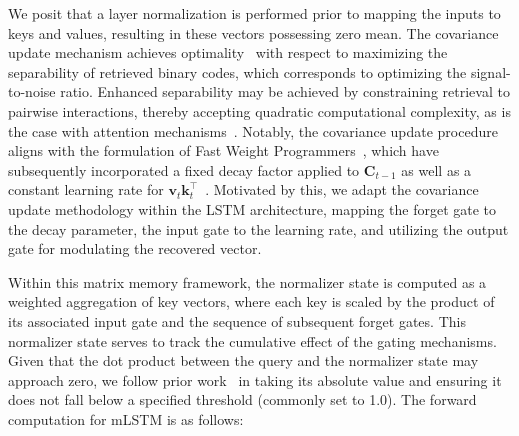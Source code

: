 We posit that a layer normalization is performed prior to mapping the inputs to keys and values, resulting in these vectors possessing zero mean. The covariance update mechanism achieves optimality~\citep{Dayan:91} with respect to maximizing the separability of retrieved binary codes, which corresponds to optimizing the signal-to-noise ratio. Enhanced separability may be achieved by constraining retrieval to pairwise interactions, thereby accepting quadratic computational complexity, as is the case with attention mechanisms~\citep{Krotov:16,Krotov:17,Ramsauer:21}. Notably, the covariance update procedure aligns with the formulation of Fast Weight Programmers~\citep{Schmidhuber:92ncfastweights,Schlag:21}, which have subsequently incorporated a fixed decay factor applied to $\mathbf{C}_{t-1}$ as well as a constant learning rate for 
$\mathbf{v}_{t} \mathbf{k}_t ^\top$~\citep{Ba:16}.
Motivated by this, we adapt the covariance update methodology within the LSTM architecture, mapping the forget gate to the decay parameter, the input gate to the learning rate, and utilizing the output gate for modulating the recovered vector.

Within this matrix memory framework, the normalizer state is computed as a weighted aggregation of key vectors, where each key is scaled by the product of its associated input gate and the sequence of subsequent forget gates. This normalizer state serves to track the cumulative effect of the gating mechanisms. Given that the dot product between the query and the normalizer state may approach zero, we follow prior work~\citep{Sun:23arxiv} in taking its absolute value and ensuring it does not fall below a specified threshold (commonly set to 1.0). The forward computation for mLSTM is as follows:


